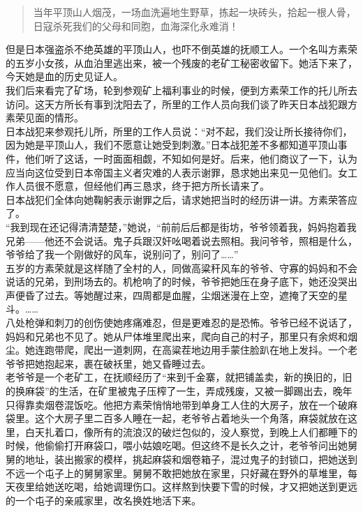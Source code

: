 \begin{quote}
	当年平顶山人烟茂，一场血洗遍地生野草，拣起一块砖头，拾起一根人骨，日寇杀死我们的父母和同胞，血海深化永难消！\\
\end{quote}

但是日本强盗杀不绝英雄的平顶山人，也吓不倒英雄的抚顺工人。一个名叫方素荣的五岁小女孩，从血泊里逃出来，被一个残废的老矿工秘密收留下。她活下来了，今天她是血的历史见证人。\\

我们后来看完了矿场，轮到参观矿上福利事业的时候，便到方素荣工作的托儿所去访问。这天方所长有事到沈阳去了，所里的工作人员向我们谈了昨天日本战犯跟方素荣见面的情形。\\

日本战犯来参观托儿所，所里的工作人员说：“对不起，我们没让所长接待你们，因为她是平顶山人，我们不愿意让她受到刺激。”日本战犯差不多都知道平顶山事件，他们听了这话，一时面面相觑，不知如何是好。后来，他们商议了一下，认为应当向这位受到日本帝国主义者灾难的人表示谢罪，恳求她出来见一见他们。女工作人员很不愿意，但经他们再三恳求，终于把方所长请来了。\\

日本战犯们全体向她鞠躬表示谢罪之后，请求她把当时的经历讲一讲。方素荣答应了。\\

“我到现在还记得清清楚楚，”她说，“前前后后都是街坊，爷爷领着我，妈妈抱着我兄弟——他还不会说话。鬼子兵跟汉奸吆喝着说去照相。我问爷爷，照相是什么，爷爷给了我一个刚做好的风车，说别问了，别问了……”\\

五岁的方素荣就是这样随了全村的人，同做高粱秆风车的爷爷、守寡的妈妈和不会说话的兄弟，到刑场去的。机枪响了的时候，爷爷把她压在身子底下，她还没哭出声便昏了过去。等她醒过来，四周都是血腥，尘烟迷漫在上空，遮掩了天空的星斗。……\\

八处枪弹和刺刀的创伤使她疼痛难忍，但是更难忍的是恐怖。爷爷已经不说话了，妈妈和兄弟也不见了。她从尸体堆里爬出来，爬向自己的村子，那里只有余烬和烟尘。她连跑带爬，爬出一道刺网，在高粱茬地边用手蒙住脸趴在地上发抖。一个老爷爷把她抱起来，裹在破袄里，她又昏睡过去。\\

老爷爷是一个老矿工，在抚顺经历了“来到千金寨，就把铺盖卖，新的换旧的，旧的换麻袋”的生活，在矿里被鬼子压榨了一生，弄成残废，又被一脚踢出去，晚年只得靠卖烟卷混饭吃。他把方素荣悄悄地带到单身工人住的大房子，放在一个破麻袋里。这个大房子里二百多人睡在一起，老爷爷占着地头一个角落，麻袋就放在这里，白天扎着口，像所有的流浪汉的破烂包似的，没人察觉，到晚上人们都睡下的时候，他偷偷打开麻袋口，喂小姑娘吃喝。但这终不是长久之计，老爷爷问出她舅舅的地址，装出搬家的模样，挑起麻袋和烟卷箱子，混过鬼子的封锁口，把她送到不远一个屯子上的舅舅家里。舅舅不敢把她放在家里，只好藏在野外的草堆里，每天夜里给她送吃喝，给她调理伤口。这样熬到快要下雪的时候，才又把她送到更远的一个屯子的亲戚家里，改名换姓地活下来。\\

